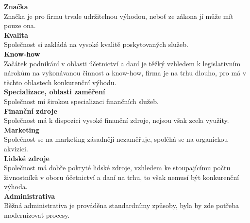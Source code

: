 \noindent\textbf{Značka}\\

Značka je pro firmu trvale udržitelnou výhodou, neboť ze zákona jí může mít pouze ona.\\

\noindent\textbf{Kvalita}\\

Společnost si zakládá na vysoké kvalitě poskytovaných služeb.\\

\noindent\textbf{Know-how}\\

Začátek podnikání v oblasti účetnictví a daní je těžký vzhledem k legislativním nárokům na vykonávanou činnost a know-how, firma je na trhu dlouho, pro má v těchto oblastech konkurenční výhodu.\\

\noindent\textbf{Specializace, oblasti zaměření}\\

Společnost mí širokou specializaci finančních služeb.\\

\noindent\textbf{Finanční zdroje}\\

Společnost má k dispozici vysoké finanční zdroje, nejsou však zcela využity.\\

\noindent\textbf{Marketing}\\

Společnost se na marketing zásadněji nezaměřuje, spoléhá se na organickou akvizici.\\

\noindent\textbf{Lidské zdroje}\\

Společnost má dobře pokryté lidské zdroje, vzhledem ke stoupajícímu počtu živnostníků v oboru účetnictví a daní na trhu, to však nemusí být konkurenční výhoda.\\

\noindent\textbf{Administrativa}\\

Běžná administrativa je prováděna standardnímy způsoby, byla by zde potřeba modernizovat procesy.\\

